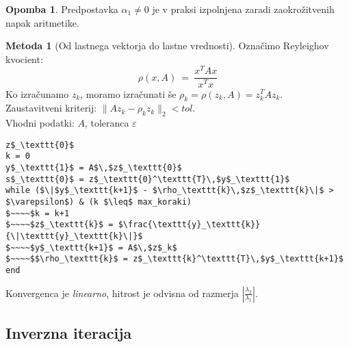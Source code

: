 \documentclass[11pt]{article}
\theoremstyle{definition}
\theoremstyle{definition}
\newtheorem*{opomba}{Opomba}
\newtheorem*{metoda}{Metoda}
\begin{document}
\begin{opomba}

Predpostavka $\alpha_1 \neq 0$ je v praksi izpolnjena zaradi zaokrožitvenih napak aritmetike.

\end{opomba}
\vspace{0.5cm}

\begin{metoda}[Od lastnega vektorja do lastne vrednosti]

Označimo Reyleighov kvocient:
$$\rho(x, A) ~=~ \frac{x^T A x}{x^T x}$$
Ko izračunamo $z_k$, moramo izračunati še $\rho_k = \rho(z_k, A) = z_k^T A z_k$. \\Zaustavitveni kriterij: $\|A z_k - \rho_k z_k\|_2 < tol$. \\

\pagebreak
\noindent Vhodni podatki: $A$, toleranca $\varepsilon$
\begin{lstlisting}
z$_\texttt{0}$
k = 0
y$_\texttt{1}$ = A$\,$z$_\texttt{0}$
s$_\texttt{0}$ = z$_\texttt{0}^\texttt{T}\,$y$_\texttt{1}$
while ($\|$y$_\texttt{k+1}$ - $\rho_\texttt{k}\,$z$_\texttt{k}\|$ > $\varepsilon$) & (k $\leq$ max_koraki)
$~~~~$k = k+1
$~~~~$z$_\texttt{k}$ = $\frac{\texttt{y}_\texttt{k}}{\|\texttt{y}_\texttt{k}\|}$
$~~~~$y$_\texttt{k+1}$ = A$\,$z$_k$
$~~~~$$\rho_\texttt{k}$ = z$_\texttt{k}^\texttt{T}\,$y$_\texttt{k+1}$
end
\end{lstlisting}
Konvergenca je \textit{linearno}, hitrost je odvisna od razmerja $\left|\frac{\lambda_2}{\lambda_1}\right|$.

\end{metoda}
\vspace{0.5cm}


\subsection{Inverzna iteracija}
\vspace{0.5cm}
\end{document}
